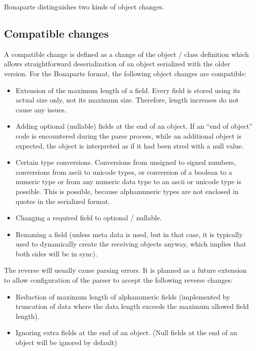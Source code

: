 \documentclass[11pt,a4paper,oneside]{article}
\begin{document}
Bonaparte distinguishes two kinds of object changes.

\subsection{Compatible changes}
A compatible change is defined as a change of the object / class definition
which allows straightforward deserialization of an object serialized with the
older version. For the Bonaparte format, the following object changes are
compatible:
\begin{itemize}
  \item Extension of the maximum length of a field. Every field is stored
  using its actual size only, not its maximum size. Therefore, length increases
  do not cause any issues.
  \item Adding optional (nullable) fields at the end of an object. If an
  ``end of object'' code is encountered during the parse process, while an
  additional object is expected, the object is interpreted as if it had been
  stred with a null value.
  \item Certain type conversions. Conversions from unsigned to signed numbers,
  conversions from ascii to unicode types, or conversion of a boolean to a
  numeric type or from any numeric data type to an ascii or unicode type is
  possible. This is possible, because alphanumeric types are not enclosed in
  quotes in the serialized format.
  \item Changing a required field to optional / nullable.
  \item Renaming a field (unless meta data is used, but in that case, it is
  typically used to dynamically create the receiving objects anyway, which
  implies that both sides will be in sync).
\end{itemize}
The reverse will usually cause parsing errors. It is planned as a future
extension to allow configuration of the parser to accept the following reverse
changes:
\begin{itemize}
  \item Reduction of maximum length of alphanumeric fields (implemented by
  truncation of data where the data length exceeds the maximum allowed field
  length).
  \item Ignoring extra fields at the end of an object. (Null fields at the end
  of an object will be ignored by default)
\end{itemize}
\end{document}
